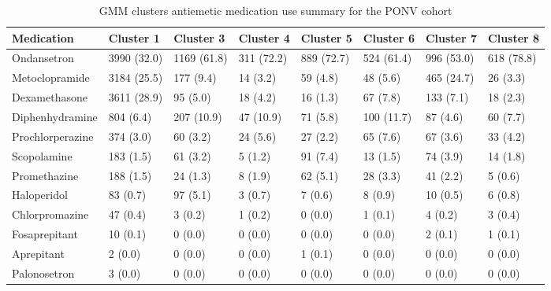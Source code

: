 \begin{table}

\caption{GMM clusters antiemetic medication use summary for the PONV cohort}
\centering
\begin{tabular}[t]{llllllll}
\toprule
Medication & Cluster 1 & Cluster 3 & Cluster 4 & Cluster 5 & Cluster 6 & Cluster 7 & Cluster 8\\
\midrule
Ondansetron & 3990 (32.0) & 1169 (61.8) & 311 (72.2) & 889 (72.7) & 524 (61.4) & 996 (53.0) & 618 (78.8)\\
Metoclopramide & 3184 (25.5) & 177 (9.4) & 14 (3.2) & 59 (4.8) & 48 (5.6) & 465 (24.7) & 26 (3.3)\\
Dexamethasone & 3611 (28.9) & 95 (5.0) & 18 (4.2) & 16 (1.3) & 67 (7.8) & 133 (7.1) & 18 (2.3)\\
Diphenhydramine & 804 (6.4) & 207 (10.9) & 47 (10.9) & 71 (5.8) & 100 (11.7) & 87 (4.6) & 60 (7.7)\\
Prochlorperazine & 374 (3.0) & 60 (3.2) & 24 (5.6) & 27 (2.2) & 65 (7.6) & 67 (3.6) & 33 (4.2)\\
\addlinespace
Scopolamine & 183 (1.5) & 61 (3.2) & 5 (1.2) & 91 (7.4) & 13 (1.5) & 74 (3.9) & 14 (1.8)\\
Promethazine & 188 (1.5) & 24 (1.3) & 8 (1.9) & 62 (5.1) & 28 (3.3) & 41 (2.2) & 5 (0.6)\\
Haloperidol & 83 (0.7) & 97 (5.1) & 3 (0.7) & 7 (0.6) & 8 (0.9) & 10 (0.5) & 6 (0.8)\\
Chlorpromazine & 47 (0.4) & 3 (0.2) & 1 (0.2) & 0 (0.0) & 1 (0.1) & 4 (0.2) & 3 (0.4)\\
Fosaprepitant & 10 (0.1) & 0 (0.0) & 0 (0.0) & 0 (0.0) & 0 (0.0) & 2 (0.1) & 1 (0.1)\\
\addlinespace
Aprepitant & 2 (0.0) & 0 (0.0) & 0 (0.0) & 1 (0.1) & 0 (0.0) & 0 (0.0) & 0 (0.0)\\
Palonosetron & 3 (0.0) & 0 (0.0) & 0 (0.0) & 0 (0.0) & 0 (0.0) & 0 (0.0) & 0 (0.0)\\
\bottomrule
\end{tabular}
\end{table}

